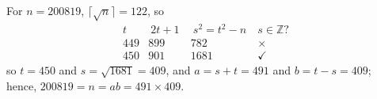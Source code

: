 \documentclass[11pt]{article}
\begin{document}
For $n = 200819$, $\lceil\sqrt{n}\rceil = 122$, so
\[
  \begin{array}{cccc}
     t  &\  2t + 1 \ &\  s^2 = t^2 -n\  & s\in\mathbb{Z}\text{?} \\\hline
    449 &    899     &      782         & \times \\
    450 &    901     &     1681         & \checkmark
  \end{array}
\]
so $t = 450$ and $s = \sqrt{1681} = 409$, and $a = s + t = 491$ and $b = t - s = 409$;\\
hence, $200819 = n = ab = 491\times 409$.
\end{document}
